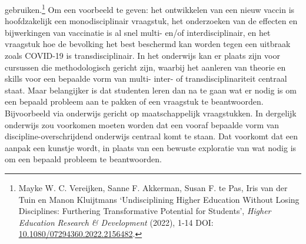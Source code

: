 \documentclass[smallauthor, chapterhaspagenum, nochapterinheader, pagenuminheader,  bigchapnum,medium2, tocpages,  garamond, titleinheader]{jote-book}
\begin{document}
gebruiken.\footnote{Mayke W. C. Vereijken, Sanne F. Akkerman, Susan F. te Pas, Iris van der Tuin en Manon Kluijtmans ‘Undisciplining Higher Education Without Losing Disciplines: Furthering Transformative Potential for Students', \emph{Higher}\emph{ }\emph{Education}\emph{ Research \& Development}\emph{ }(2022), 1-14 DOI: \href{https://papers.ssrn.com/sol3/papers.cfm?abstract_id=2350964}{10.1080/07294360.2022.2156482}.} Om een voorbeeld te geven: het ontwikkelen van een nieuw vaccin is hoofdzakelijk een monodisciplinair vraagstuk, het onderzoeken van de effecten en bijwerkingen van vaccinatie is al snel multi- en/of interdisciplinair, en het vraagstuk hoe de bevolking het best beschermd kan worden tegen een uitbraak zoals COVID-19 is transdisciplinair. In het onderwijs kan er plaats zijn voor cursussen die methodologisch gericht zijn, waarbij het aanleren van theorie en skills voor een bepaalde vorm van multi- inter- of transdisciplinariteit centraal staat. Maar belangijker is dat studenten leren dan na te gaan wat er nodig is om een bepaald probleem aan te pakken of een vraagstuk te beantwoorden. Bijvoorbeeld via onderwijs gericht op maatschappelijk vraagstukken. In dergelijk onderwijs zou voorkomen moeten worden dat een vooraf bepaalde vorm van discipline-overschrijdend onderwijs centraal komt te staan. Dat voorkomt dat een aanpak een kunstje wordt, in plaats van een bewuste exploratie van wat nodig is om een bepaald probleem te beantwoorden.
\end{document}
